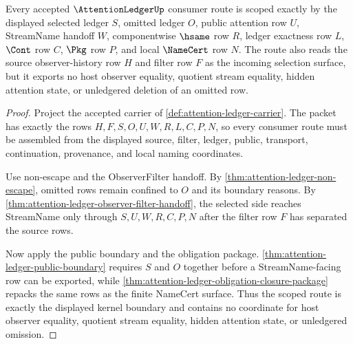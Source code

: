 \begin{theorem}
\label{thm:attention-ledger-scoped-kernel-boundary}
Every accepted $\AttentionLedgerUp$ consumer route is scoped exactly by the displayed selected ledger $S$, omitted ledger $O$, public attention row $U$, StreamName handoff $W$, componentwise $\hsame$ row $R$, ledger exactness row $L$, $\Cont$ row $C$, $\Pkg$ row $P$, and local $\NameCert$ row $N$. The route also reads the source observer-history row $H$ and filter row $F$ as the incoming selection surface, but it exports no host observer equality, quotient stream equality, hidden attention state, or unledgered deletion of an omitted row.
\end{theorem}
\begin{proof}
Project the accepted carrier of \autoref{def:attention-ledger-carrier}. The packet has exactly the rows $H,F,S,O,U,W,R,L,C,P,N$, so every consumer route must be assembled from the displayed source, filter, ledger, public, transport, continuation, provenance, and local naming coordinates.

Use non-escape and the ObserverFilter handoff. By \autoref{thm:attention-ledger-non-escape}, omitted rows remain confined to $O$ and its boundary reasons. By \autoref{thm:attention-ledger-observer-filter-handoff}, the selected side reaches StreamName only through $S,U,W,R,C,P,N$ after the filter row $F$ has separated the source rows.

Now apply the public boundary and the obligation package. \autoref{thm:attention-ledger-public-boundary} requires $S$ and $O$ together before a StreamName-facing row can be exported, while \autoref{thm:attention-ledger-obligation-closure-package} repacks the same rows as the finite NameCert surface. Thus the scoped route is exactly the displayed kernel boundary and contains no coordinate for host observer equality, quotient stream equality, hidden attention state, or unledgered omission.
\end{proof}

